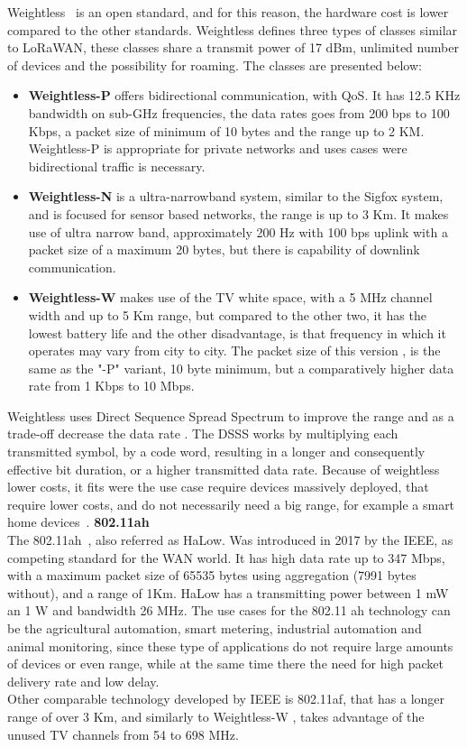 Weightless~\cite{Weightlesswebb2012understanding} is an open standard, and for this reason, the hardware cost is lower compared to the other standards. Weightless defines three types of classes similar to LoRaWAN, these classes share a transmit power of 17 dBm, unlimited number of devices and the possibility for roaming. The classes are presented below:
\begin{itemize}
	\item \textbf{Weightless-P} offers bidirectional communication, with QoS. It has 12.5 KHz bandwidth on sub-GHz frequencies, the data rates goes from 200 bps to 100 Kbps, a packet size of minimum of 10 bytes and the range up to 2 KM. Weightless-P is appropriate for private networks and uses cases were bidirectional traffic is necessary.
	\item\textbf{Weightless-N} is a ultra-narrowband system, similar to the Sigfox system, and is  focused for sensor based networks, the range is up to 3 Km. It makes use of  ultra narrow band, approximately  200 Hz with 100 bps uplink with a packet size of a maximum 20 bytes, but there is capability of downlink communication.
	\item \textbf{Weightless-W} makes use of the TV white space, with a 5 MHz channel width and up to 5 Km range, but compared to the other two, it has the lowest battery life and the other disadvantage, is that frequency in which it operates may vary from city to city. The packet size of this version , is the same as the "-P"  variant, 10 byte minimum, but a comparatively higher data rate from 1 Kbps to 10 Mbps.

\end{itemize} 
Weightless uses Direct Sequence Spread Spectrum to improve the range and as a trade-off decrease the data rate . 
The DSSS  works by multiplying each transmitted symbol, by a code word, resulting in a longer and consequently effective bit duration, or a higher transmitted data rate. Because of weightless lower costs, it fits were the use case require devices massively deployed, that require lower costs, and do not  necessarily need a big range, for example a  smart home devices~\cite{LPRaza2017}.\newline\newline
\textbf{802.11ah}\\

The 802.11ah~\cite{Adame2014}, also referred as HaLow. Was introduced in 2017 by the IEEE, as competing standard for the WAN world. It has high data rate up to 347 Mbps, with a maximum packet size of 65535 bytes using aggregation (7991 bytes without), and a range of 1Km. HaLow has a  transmitting power between 1 mW an 1 W and bandwidth 26 MHz. 
The use cases for the 802.11 ah technology can be the agricultural automation, smart metering, industrial automation and animal monitoring, since these type of applications do not require large amounts of devices or even range, while at the same time there the need for high packet delivery rate and low delay.\\
Other comparable technology developed by IEEE is 802.11af, that has a longer range of over 3 Km, and similarly to Weightless-W , takes advantage of the  unused TV channels from 54 to 698 MHz.

